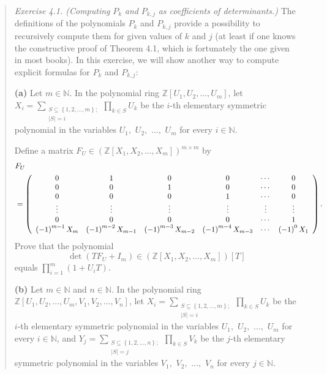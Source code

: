 \documentclass[numbers=enddot,12pt,final,onecolumn,notitlepage]{scrartcl}%
\begin{document}
\begin{quotation}
\textit{Exercise 4.1. (Computing }$P_{k}$ \textit{and }$P_{k,j}$ \textit{as
coefficients of determinants.)} The definitions of the polynomials $P_{k}$ and
$P_{k,j}$ provide a possibility to recursively compute them for given values
of $k$ and $j$ (at least if one knows the constructive proof of Theorem 4.1,
which is fortunately the one given in most books). In this exercise, we will
show another way to compute explicit formulas for $P_{k}$ and $P_{k,j}$:

\textbf{(a)} Let $m\in\mathbb{N}$. In the polynomial ring $\mathbb{Z}\left[
U_{1},U_{2},...,U_{m}\right]  $, let $X_{i}=\sum\limits_{\substack{S\subseteq
\left\{  1,2,...,m\right\}  ;\\\left\vert S\right\vert =i}}\prod\limits_{k\in
S}U_{k}$ be the $i$-th elementary symmetric polynomial in the variables
$U_{1},$ $U_{2},$ $...,$ $U_{m}$ for every $i\in\mathbb{N}$.

Define a matrix $F_{U}\in\left(  \mathbb{Z}\left[  X_{1},X_{2},...,X_{m}%
\right]  \right)  ^{m\times m}$ by%
\begin{align*}
&  F_{U}\\
&  =\left(
\begin{array}
[c]{cccccc}%
0 & 1 & 0 & 0 & \cdots & 0\\
0 & 0 & 1 & 0 & \cdots & 0\\
0 & 0 & 0 & 1 & \cdots & 0\\
\vdots & \vdots & \vdots & \vdots & \vdots & \vdots\\
0 & 0 & 0 & 0 & \cdots & 1\\
\left(  -1\right)  ^{m-1}X_{m} & \left(  -1\right)  ^{m-2}X_{m-1} & \left(
-1\right)  ^{m-3}X_{m-2} & \left(  -1\right)  ^{m-4}X_{m-3} & \cdots & \left(
-1\right)  ^{0}X_{1}%
\end{array}
\right)  .
\end{align*}
Prove that the polynomial
\[
\det\left(  TF_{U}+I_{m}\right)  \in\left(  \mathbb{Z}\left[  X_{1}%
,X_{2},...,X_{m}\right]  \right)  \left[  T\right]
\]
equals $\prod\limits_{i=1}^{m}\left(  1+U_{i}T\right)  $.

\textbf{(b)} Let $m\in\mathbb{N}$ and $n\in\mathbb{N}$. In the polynomial ring
$\mathbb{Z}\left[  U_{1},U_{2},...,U_{m},V_{1},V_{2},...,V_{n}\right]  $, let
$X_{i}=\sum\limits_{\substack{S\subseteq\left\{  1,2,...,m\right\}
;\\\left\vert S\right\vert =i}}\prod\limits_{k\in S}U_{k}$ be the $i$-th
elementary symmetric polynomial in the variables $U_{1},$ $U_{2},$ $...,$
$U_{m}$ for every $i\in\mathbb{N}$, and $Y_{j}=\sum
\limits_{\substack{S\subseteq\left\{  1,2,...,n\right\}  ;\\\left\vert
S\right\vert =j}}\prod\limits_{k\in S}V_{k}$ be the $j$-th elementary
symmetric polynomial in the variables $V_{1},$ $V_{2},$ $...,$ $V_{n}$ for
every $j\in\mathbb{N}$.


\end{quotation}
\end{document}
